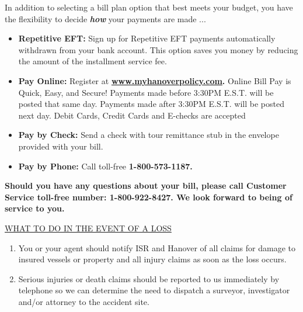 \documentclass[10pt]{article}
\begin{document}
\hfill \break
\noindent In addition to selecting a bill plan option that best meets your budget, you have the flexibility to decide \textbf{\emph{how}} your payments are made ...

\begin{itemize}
    \itemsep0em
    \item \textbf{Repetitive EFT:} Sign up for Repetitive EFT payments automatically withdrawn from your bank account. This option saves you money by reducing the amount of the installment service fee.

    \item \textbf{Pay Online:} Register at \textbf{\underline{www.myhanoverpolicy.com}.} Online Bill Pay is Quick, Easy, and Secure! Payments made before 3:30PM E.S.T. will be posted that same day. Payments made after 3:30PM E.S.T. will be posted next day. Debit Cards, Credit Cards and E-checks are accepted

    \item \textbf{Pay by Check:} Send a check with tour remittance stub in the envelope provided with your bill.
    
    \item \textbf{Pay by Phone:} Call toll-free \textbf{1-800-573-1187.}
\end{itemize}

\noindent \textbf{Should you have any questions about your bill, please call Customer Service toll-free number: 1-800-922-8427.
We look forward to being of service to you.}



\newpage
 \extramarks{}{} 

\hfill


\begin{center}
{\large \underline{WHAT TO DO IN THE EVENT OF A LOSS}}
\end{center}

\begin{enumerate}
    \item \large{You or your agent should notify ISR and Hanover of all claims for damage to insured vessels or property and all injury claims as soon as the loss occurs.}
    \hfill
    \item \large{Serious injuries or death claims should be reported to us immediately by telephone so we can determine the need to dispatch a surveyor, investigator and/or attorney to the accident site.}
\end{enumerate}
\end{document}
